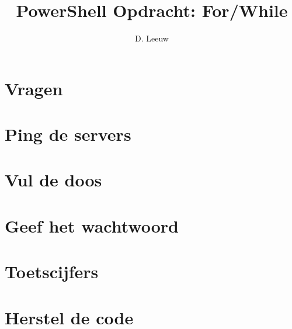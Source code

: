 \documentclass[a4paper,12pt,twoside,openright,titlepage]{article}
\author{D. Leeuw}
\title{PowerShell Opdracht: For/While}
\date{\today\\
0.0.0\\
\vfill
\raggedright
\copyright\ 2026 Dennis Leeuw\\
}
\begin{document}

\maketitle



\section{Vragen}


\section{Ping de servers}


\section{Vul de doos}

\section{Geef het wachtwoord}

\section{Toetscijfers}


\section{Herstel de code}


\printindex
\end{document}
